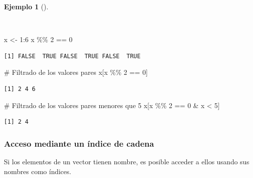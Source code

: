 \documentclass[
  a4paper,
]{scrreport}
\newenvironment{Shaded}{\begin{snugshade}}{\end{snugshade}}
\newcommand{\CommentTok}[1]{\textcolor[rgb]{0.37,0.37,0.37}{#1}}
\newcommand{\DecValTok}[1]{\textcolor[rgb]{0.68,0.00,0.00}{#1}}
\newcommand{\NormalTok}[1]{\textcolor[rgb]{0.00,0.23,0.31}{#1}}
\newcommand{\OtherTok}[1]{\textcolor[rgb]{0.00,0.23,0.31}{#1}}
\newcommand{\SpecialCharTok}[1]{\textcolor[rgb]{0.37,0.37,0.37}{#1}}
\theoremstyle{definition}
\theoremstyle{definition}
\newtheorem{example}{Ejemplo}[chapter]
\theoremstyle{remark}
\begin{document}
\begin{example}[]\protect\hypertarget{exm-filtros}{}\label{exm-filtros}

~

\begin{Shaded}
\begin{Highlighting}[]
\NormalTok{x }\OtherTok{\textless{}{-}} \DecValTok{1}\SpecialCharTok{:}\DecValTok{6}
\NormalTok{x }\SpecialCharTok{\%\%} \DecValTok{2} \SpecialCharTok{==} \DecValTok{0}
\end{Highlighting}
\end{Shaded}

\begin{verbatim}
[1] FALSE  TRUE FALSE  TRUE FALSE  TRUE
\end{verbatim}

\begin{Shaded}
\begin{Highlighting}[]
\CommentTok{\# Filtrado de los valores pares}
\NormalTok{x[x }\SpecialCharTok{\%\%} \DecValTok{2} \SpecialCharTok{==} \DecValTok{0}\NormalTok{]}
\end{Highlighting}
\end{Shaded}

\begin{verbatim}
[1] 2 4 6
\end{verbatim}

\begin{Shaded}
\begin{Highlighting}[]
\CommentTok{\# Filtrado de los valores pares menores que 5}
\NormalTok{x[x }\SpecialCharTok{\%\%} \DecValTok{2} \SpecialCharTok{==} \DecValTok{0} \SpecialCharTok{\&}\NormalTok{ x }\SpecialCharTok{\textless{}} \DecValTok{5}\NormalTok{]}
\end{Highlighting}
\end{Shaded}

\begin{verbatim}
[1] 2 4
\end{verbatim}

\end{example}

\hypertarget{acceso-mediante-un-uxedndice-de-cadena}{%
\subsubsection{Acceso mediante un índice de
cadena}\label{acceso-mediante-un-uxedndice-de-cadena}}

Si los elementos de un vector tienen nombre, es posible acceder a ellos
usando sus nombres como índices.
\end{document}
